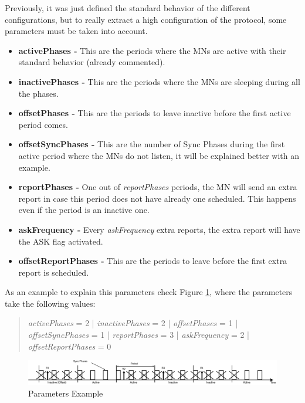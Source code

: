 Previously, it was just defined the standard behavior of the different configurations, but to really extract a high configuration of the protocol, some 
parameters must be taken into account.

\begin{itemize}
 \item \textbf{activePhases -} This are the periods where the \acp{MN} are active with their standard behavior (already commented).
 \item \textbf{inactivePhases -} This are the periods where the \acp{MN} are sleeping during all the phases.
 \item \textbf{offsetPhases -} This are the periods to leave inactive before the first active period comes.
 \item \textbf{offsetSyncPhases -} This are the number of Sync Phases during the first active period where the \acp{MN} do not listen, it will be explained 
better with an example.
 \item \textbf{reportPhases -} One out of \textit{reportPhases} periods, the \ac{MN} will send an extra report in case this period does not have already one
scheduled. This happens even if the period is an inactive one.
 \item \textbf{askFrequency -} Every \textit{askFrequency} extra reports, the extra report will have the ASK flag activated.
 \item \textbf{offsetReportPhases -} This are the periods to leave before the first extra report is scheduled.
\end{itemize}
 
As an example to explain this parameters check Figure \ref{fig:parametersphases}, where the parameters take the following values: 

\begin{quote}
 \textit{activePhases} = 2 | \textit{inactivePhases} = 2 | \textit{offsetPhases} = 1 | \textit{offsetSyncPhases} = 1 | \textit{reportPhases} = 3 
| \textit{askFrequency} = 2 | \textit{offsetReportPhases} = 0
\end{quote}

\begin{figure}[ht]
 \begin{center}
  \includegraphics[width=1\textwidth]{parametersphases.eps}
 \end{center}
 \caption{Parameters Example}
 \label{fig:parametersphases}
\end{figure}

